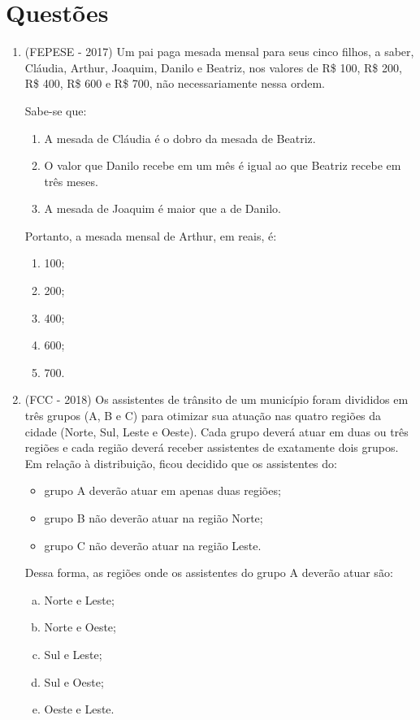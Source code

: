 \section{Questões}

\begin{enumerate}
 \item (FEPESE - 2017) Um pai paga mesada mensal para seus cinco filhos, a saber, Cláudia, Arthur, Joaquim, Danilo e Beatriz, nos valores de R\$ 100, R\$ 200, R\$ 400, R\$ 600 e R\$ 700, não necessariamente nessa ordem. 

Sabe-se que: 
\begin{enumerate}[1.]
\item A mesada de Cláudia é o dobro da mesada de Beatriz.
\item O valor que Danilo recebe em um mês é igual ao que Beatriz recebe em três meses.
\item A mesada de Joaquim é maior que a de Danilo. 
\end{enumerate}
Portanto, a mesada mensal de Arthur, em reais, é:
\begin{multicols}{5}
\begin{enumerate}
\item 100;
\item 200;
\item 400;
\item 600;
\item 700.
\end{enumerate}
\end{multicols}

\item (FCC - 2018) Os assistentes de trânsito de um município foram divididos em três grupos (A, B e C) para otimizar sua atuação nas quatro regiões da cidade (Norte, Sul, Leste e Oeste). Cada grupo deverá atuar em duas ou três regiões e cada região deverá receber assistentes de exatamente dois grupos. Em relação à distribuição, ficou decidido que os assistentes do:
\begin{itemize}
 \item grupo A deverão atuar em apenas duas regiões;
 \item grupo B não deverão atuar na região Norte;
 \item grupo C não deverão atuar na região Leste.
\end{itemize}
Dessa forma, as regiões onde os assistentes do grupo A deverão atuar são:
\begin{multicols}{2}
\begin{enumerate}[a)]
\item Norte e Leste;
\item Norte e Oeste;
\item Sul e Leste;
\item Sul e Oeste;
\item Oeste e Leste.
\end{enumerate}
\end{multicols}


\end{enumerate}
